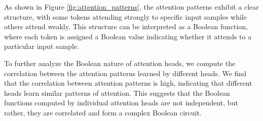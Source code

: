 As shown in Figure \ref{fig:attention_patterns}, the attention patterns exhibit a clear structure, with some tokens attending strongly to specific input samples while others attend weakly. This structure can be interpreted as a Boolean function, where each token is assigned a Boolean value indicating whether it attends to a particular input sample.













To further analyze the Boolean nature of attention heads, we compute the correlation between the attention patterns learned by different heads. We find that the correlation between attention patterns is high, indicating that different heads learn similar patterns of attention. This suggests that the Boolean functions computed by individual attention heads are not independent, but rather, they are correlated and form a complex Boolean circuit.































































